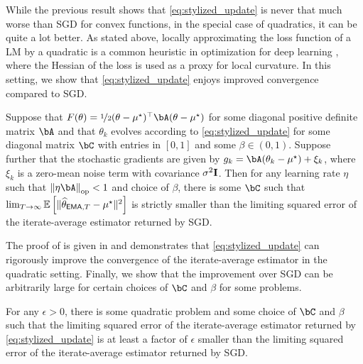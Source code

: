 While the previous result shows that \eqref{eq:stylized_update} is never that much worse than SGD for convex functions, in the special case of quadratics, it can be quite a lot better.  As stated above, locally approximating the loss function of a LM by a quadratic is a common heuristic in optimization for deep learning \citep{block2025ema,block2024butterfly,zhang2019lookahead,zhang2019algorithmic}, where the Hessian of the loss is used as a proxy for local curvature.  In this setting, we show that \eqref{eq:stylized_update} enjoys improved convergence compared to SGD.
\begin{proposition}\label{prop:improved_convergence_quadratic}
    Suppose that $F(\theta) = \nicefrac 12 (\theta - \mustar)^\top \bA (\theta - \mustar)$ for some diagonal positive definite matrix $\bA$ and that $\theta_k$ evolves according to \eqref{eq:stylized_update} for some diagonal matrix $\bC$ with entries in $[0, 1]$ and some $\beta \in (0, 1)$.  Suppose further that the stochastic gradients are given by $g_k = \bA (\theta_k - \mustar) + \xi_k$, where $\xi_k$ is a zero-mean noise term with covariance $\sigma^2 \eye$.  Then for any learning rate $\eta$ such that $\normop{\eta \bA} < 1$ and choice of $\beta$, there is some $\bC$ such that $\lim_{T \to \infty} \ee\left[ \|\thetema[T] - \mustar\|^2 \right]$ is strictly smaller than the limiting squared error of the iterate-average estimator returned by SGD.
\end{proposition}
The proof of  is given in  and demonstrates that \eqref{eq:stylized_update} can rigorously improve the convergence of the iterate-average estimator in the quadratic setting.  
Finally, we show that the improvement over SGD can be arbitrarily large for certain choices of $\bC$ and $\beta$ for some problems.
\begin{proposition}\label{prop:arbitrarily_large_improvement}
    For any $\epsilon > 0$, there is some quadratic problem and some choice of $\bC$ and $\beta$ such that the limiting squared error of the iterate-average estimator returned by \eqref{eq:stylized_update} is at least a factor of $\epsilon$ smaller than the limiting squared error of the iterate-average estimator returned by SGD.
\end{proposition}



